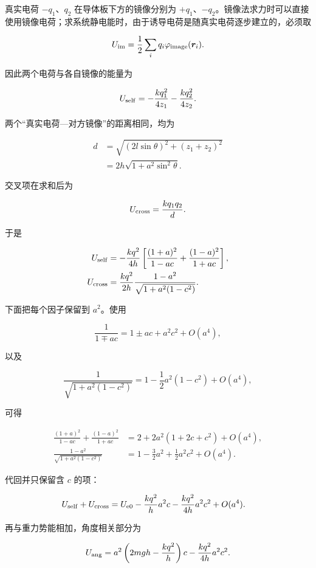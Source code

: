 \documentclass[12pt,a4paper,UTF8]{ctexart}
\begin{document}
真实电荷 \(-q_1\)、\(q_2\) 在导体板下方的镜像分别为
\(+q_1\)、\(-q_2\)。镜像法求力时可以直接使用镜像电荷；求系统静电能时，由于诱导电荷是随真实电荷逐步建立的，必须取

\[
U_{\rm im}=\frac12\sum_i q_i\varphi_{\rm image}(\boldsymbol r_i).
\]

因此两个电荷与各自镜像的能量为

\[
U_{\rm self}
=-\frac{kq_1^2}{4z_1}-\frac{kq_2^2}{4z_2}.
\]

两个``真实电荷---对方镜像''的距离相同，均为

\[
\begin{aligned}
d
&=\sqrt{(2l\sin\theta)^2+(z_1+z_2)^2}\\
&=2h\sqrt{1+a^2\sin^2\theta}.
\end{aligned}
\]

交叉项在求和后为

\[
U_{\rm cross}=\frac{kq_1q_2}{d}.
\]

于是

\[
\begin{aligned}
U_{\rm self}
&=-\frac{kq^2}{4h}
\left[
\frac{(1+a)^2}{1-ac}
+\frac{(1-a)^2}{1+ac}
\right],\\
U_{\rm cross}
&=\frac{kq^2}{2h}
\frac{1-a^2}{\sqrt{1+a^2(1-c^2)}}.
\end{aligned}
\]

下面把每个因子保留到 \(a^2\)。使用

\[
\frac1{1\mp ac}=1\pm ac+a^2c^2+O(a^4),
\]

以及

\[
\frac1{\sqrt{1+a^2(1-c^2)}}
=1-\frac12a^2(1-c^2)+O(a^4),
\]

可得

\[
\begin{aligned}
\frac{(1+a)^2}{1-ac}
+\frac{(1-a)^2}{1+ac}
&=2+2a^2(1+2c+c^2)+O(a^4),\\
\frac{1-a^2}{\sqrt{1+a^2(1-c^2)}}
&=1-\frac32a^2+\frac12a^2c^2+O(a^4).
\end{aligned}
\]

代回并只保留含 \(c\) 的项：

\[
\begin{aligned}
U_{\rm self}+U_{\rm cross}
&=U_{\rm e0}
-\frac{kq^2}{h}a^2c
-\frac{kq^2}{4h}a^2c^2
+O(a^4).
\end{aligned}
\]

再与重力势能相加，角度相关部分为

\[
U_{\rm ang}
=a^2\left(2mgh-\frac{kq^2}{h}\right)c
-\frac{kq^2}{4h}a^2c^2.
\]
\end{document}
